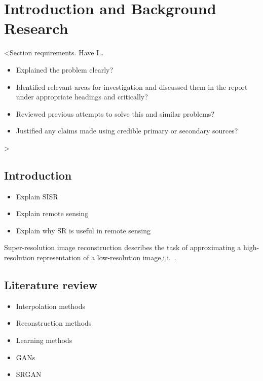 \chapter{Introduction and Background Research}

\label{chapter1}

<Section requirements. Have I\dots
\begin{itemize}
    \item Explained the problem clearly?
    \item Identified relevant areas for investigation and discussed them in the report under appropriate headings and critically?
    \item Reviewed previous attempts to solve this and similar problems?
    \item Justified any claims made using credible primary or secondary sources?
\end{itemize}
>

\section{Introduction}

\begin{itemize}
    \item Explain SISR
    \item Explain remote sensing
    \item Explain why SR is useful in remote sensing
\end{itemize}

Super-resolution image reconstruction describes the task of approximating a high-resolution representation of a low-resolution image,i,i.~\cite{superResOverview}.

\section{Literature review}

\begin{itemize}
    \item Interpolation methods
    \item Reconstruction methods
    \item Learning methods
    \item GANs
    \item SRGAN
\end{itemize}